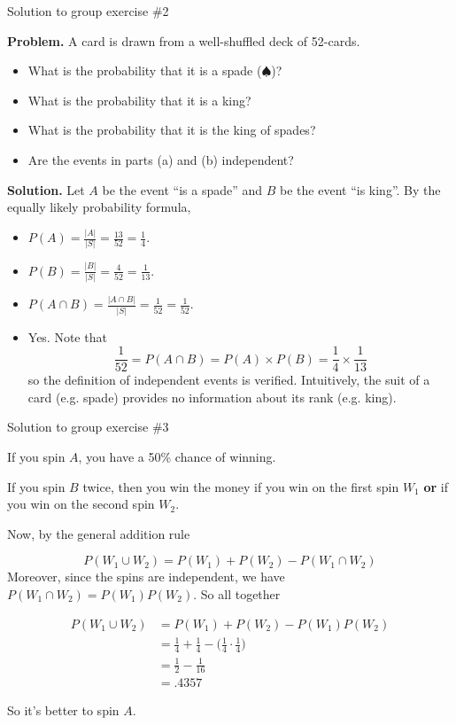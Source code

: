 \documentclass[10pt]{beamer}
\begin{document}
\begin{frame}{Solution to group exercise \#2}


\textbf{Problem.} A card is drawn from a well-shuffled deck of 52-cards.
	\begin{itemize}
	\item[a.] What is the probability that it is a spade ($\spadesuit$)?
	\item[b.] What is the probability that it is a king?	
	\item[c.] What is the probability that it is the king of spades?
	\item[d.] Are the events in parts (a) and (b) independent?
	\end{itemize}
\vfill 
\textbf{Solution.} Let $A$ be the event \enquote{is a spade} and $B$ be the event \enquote{is king}. By the equally likely probability formula,
	\begin{itemize}
	\item[a.] $P(A) = \frac{|A|}{|S|} = \frac{13}{52} = \frac{1}{4}.$
	\item[b.] $P(B) = \frac{|B|}{|S|} = \frac{4}{52} = \frac{1}{13}.$	
	\item[c.] $P(A \cap B) = \frac{|A \cap B|}{|S|} = \frac{1}{52} = \frac{1}{52}.$	
	\item[d.] Yes. Note that 
	\[ \frac{1}{52} = P(A \cap B) =P(A) \times P(B) = \frac{1}{4} \times \frac{1}{13} \]
	so the definition of independent events is verified.  Intuitively, the suit of a card (e.g. spade) provides no information about its rank (e.g. king). 
	\end{itemize}

\end{frame}

\begin{frame}{Solution to group exercise \#3}

If you spin $A$, you have a 50\% chance of winning.

If you spin $B$ twice, then you win the money if you win on the first spin $W_1$ \textbf{or} if you win on the second spin $W_2$.

Now, by the general addition rule

\[
P(W_1 \cup W_2) = P(W_1) + P(W_2) - P(W_1 \cap W_2)	
\]
%
Moreover, since the spins are independent, we have $P(W_1 \cap W_2) = P(W_1) P(W_2)$.   So all together

\begin{align*}
P(W_1 \cup W_2) &= P(W_1) + P(W_2) - P(W_1) P(W_2) \\
&= \frac{1}{4} + \frac{1}{4} - \bigg(\frac{1}{4} \cdot \frac{1}{4}\bigg) \\
&= \frac{1}{2} - \frac{1}{16}\\
&=.4357	
\end{align*}

So it's better to spin $A$.

\end{frame}
\end{document}
